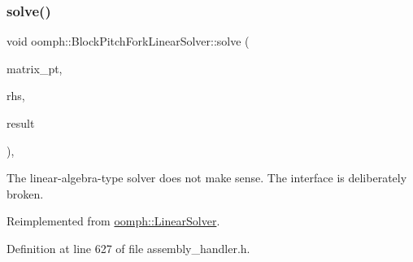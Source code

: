 \mbox{\label{classoomph_1_1BlockPitchForkLinearSolver_aaa6dbd59c0f6db8e5a19689888b17eac}} 
\subsubsection{\texorpdfstring{solve()}{solve()}\hspace{0.1cm}{\footnotesize\ttfamily [2/3]}}
{\footnotesize\ttfamily void oomph\+::\+Block\+Pitch\+Fork\+Linear\+Solver\+::solve (\begin{DoxyParamCaption}\item[{\hyperlink{classoomph_1_1DoubleMatrixBase}{Double\+Matrix\+Base} $\ast$const \&}]{matrix\+\_\+pt,  }\item[{const \hyperlink{classoomph_1_1DoubleVector}{Double\+Vector} \&}]{rhs,  }\item[{\hyperlink{classoomph_1_1DoubleVector}{Double\+Vector} \&}]{result }\end{DoxyParamCaption})\hspace{0.3cm}{\ttfamily [inline]}, {\ttfamily [virtual]}}



The linear-\/algebra-\/type solver does not make sense. The interface is deliberately broken. 



Reimplemented from \hyperlink{classoomph_1_1LinearSolver_a546c09822d18191df14caed864c04c09}{oomph\+::\+Linear\+Solver}.



Definition at line 627 of file assembly\+\_\+handler.\+h.

\mbox{\label{classoomph_1_1BlockPitchForkLinearSolver_a45c8a56bd1942374756feb9edcfb6151}} 
